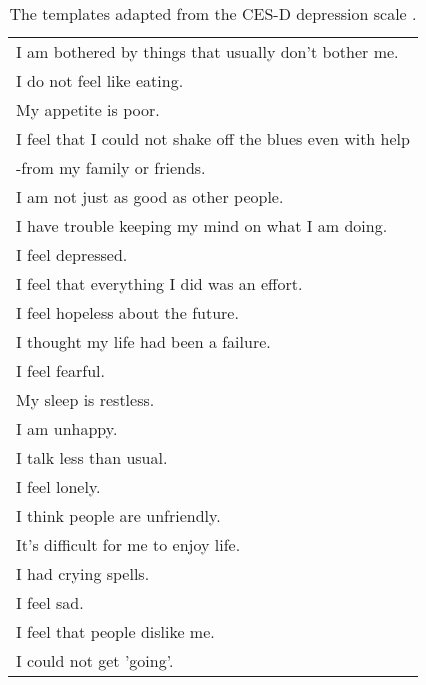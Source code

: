  \begin{table}
    \centering
    \small
    \begin{tabular}{l}
      \hline
      I am bothered by things that usually don't bother me. \\
      I do not feel like eating. \\
      My appetite is poor. \\
      I feel that I could not shake off the blues even with help \\
      -from my family or friends. \\
      I am not just as good as other people. \\
      I have trouble keeping my mind on what I am doing. \\
      I feel depressed. \\
      I feel that everything I did was an effort. \\
      I feel hopeless about the future. \\
      I thought my life had been a failure. \\
      I feel fearful. \\
      My sleep is restless. \\
      I am unhappy. \\
      I talk less than usual. \\
      I feel lonely. \\
      I think people are unfriendly. \\
      It's difficult for me to enjoy life. \\
      I had crying spells. \\
      I feel sad. \\
      I feel that people dislike me. \\
      I could not get 'going'. \\
      \hline
    \end{tabular}
    \caption{\label{tab:CES-D} The templates adapted from the CES-D depression scale \citep{Lenore1977CES-D}. }
  \end{table}
  
